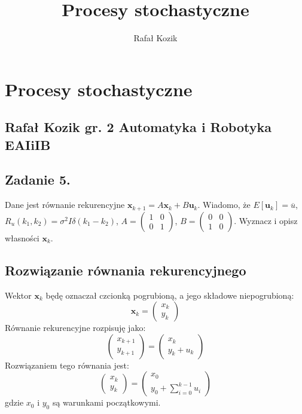 \documentclass[10pt,a4paper]{article}
\author{Rafał Kozik}
\title{Procesy stochastyczne}
\begin{document}
\section*{Procesy stochastyczne}
\subsection*{Rafał Kozik gr. 2 Automatyka i Robotyka EAIiIB}
	\subsection*{Zadanie 5.}
	Dane jest równanie rekurencyjne $\textbf{x}_{k+1} = A \textbf{x}_k +B \textbf{u}_k$. Wiadomo, że $E[\textbf{u}_k] = \overline{u} $, $R_u(k_1, k_2)= \sigma^2 I \delta (k_1-k_2)$, 
	$A = \left( \begin{smallmatrix} 1&0 \\ 0&1 \end{smallmatrix} \right)$, $B = \left( \begin{smallmatrix} 0&0 \\ 1&0 \end{smallmatrix} \right)$. Wyznacz i opisz własności $\textbf{x}_k$.

\subsection*{Rozwiązanie równania rekurencyjnego}
Wektor $\textbf{x}_k$ będę oznaczał czcionką pogrubioną, a jego składowe niepogrubioną:
\begin{equation}
	\textbf{x}_k = \left( \begin{matrix}
	 x_k \\ y_k
	\end{matrix} \right)
\end{equation}	  
Równanie rekurencyjne rozpisuję jako:
\begin{equation}
	\left(
	\begin{matrix}
		x_{k+1}\\
		y_{k+1}		
	\end{matrix}
	\right) = 
	\left(
	\begin{matrix}
		x_{k}\\
		y_{k}+u_k		
	\end{matrix}
	\right)
\end{equation}
Rozwiązaniem tego równania jest:
\begin{equation}
	\left(
	\begin{matrix}
		x_k \\ y_k
	\end{matrix}
	\right) 
	 =
	\left(
	\begin{matrix}
		x_0 \\ y_0 + \sum\limits_{i=0}^{k-1}u_i
	\end{matrix}
	\right) 
\end{equation}
gdzie $x_0$ i $y_0$ są warunkami początkowymi.
\end{document}
